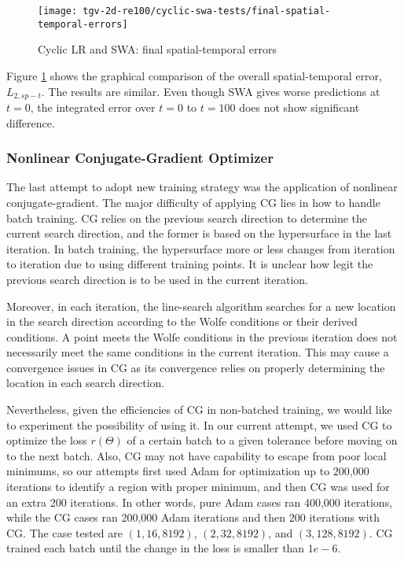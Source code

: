 \begin{figure}[hbt!]
    \centering%
    \texttt{[image: tgv-2d-re100/cyclic-swa-tests/final-spatial-temporal-errors]}%
    \caption[%
        Cyclic LR and SWA: final spatial-temporal errors%
    ]{%
        Cyclic LR and SWA: final spatial-temporal errors%
    }\label{fig:cyclic-swa-tests-final-sterrs}%
\end{figure}

Figure \ref{fig:cyclic-swa-tests-final-sterrs} shows the graphical comparison of the overall spatial-temporal error, $L_{2,sp-t}$.
The results are similar.
Even though SWA gives worse predictions at $t=0$, the integrated error over $t=0$ to $t=100$ does not show significant difference.

\subsubsection{Nonlinear Conjugate-Gradient Optimizer}
\label{sec:ncg-tests}

The last attempt to adopt new training strategy was the application of nonlinear conjugate-gradient.
The major difficulty of applying CG lies in how to handle batch training.
CG relies on the previous search direction to determine the current search direction, and the former is based on the hypersurface in the last iteration.
In batch training, the hypersurface more or less changes from iteration to iteration due to using different training points.
It is unclear how legit the previous search direction is to be used in the current iteration.

Moreover, in each iteration, the line-search algorithm searches for a new location in the search direction according to the Wolfe conditions or their derived conditions.
A point meets the Wolfe conditions in the previous iteration does not necessarily meet the same conditions in the current iteration.
This may cause a convergence issues in CG as its convergence relies on properly determining the location in each search direction.

Nevertheless, given the efficiencies of CG in non-batched training, we would like to experiment the possibility of using it.
In our current attempt, we used CG to optimize the loss $r(\Theta)$ of a certain batch to a given tolerance before moving on to the next batch.
Also, CG may not have capability to escape from poor local minimums, so our attempts first used Adam for optimization up to 200,000 iterations to identify a region with proper minimum, and then CG was used for an extra 200 iterations.
In other words, pure Adam cases ran 400,000 iterations, while the CG cases ran 200,000 Adam iterations and then 200 iterations with CG.
The case tested are $(1, 16, 8192)$, $(2, 32, 8192)$, and $(3, 128, 8192)$.
CG trained each batch until the change in the loss is smaller than $1e-6$.

